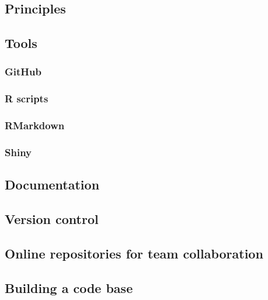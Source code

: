 \documentclass[
]{book}
\begin{document}
\hypertarget{principles}{%
\subsection{Principles}\label{principles}}

\hypertarget{tools}{%
\subsection{Tools}\label{tools}}

\hypertarget{github-1}{%
\subsubsection{GitHub}\label{github-1}}

\hypertarget{r-scripts}{%
\subsubsection{R scripts}\label{r-scripts}}

\hypertarget{rmarkdown}{%
\subsubsection{RMarkdown}\label{rmarkdown}}

\hypertarget{shiny}{%
\subsubsection{Shiny}\label{shiny}}

\hypertarget{documentation}{%
\subsection{Documentation}\label{documentation}}

\hypertarget{version-control}{%
\subsection{Version control}\label{version-control}}

\hypertarget{online-repositories-for-team-collaboration}{%
\subsection{Online repositories for team collaboration}\label{online-repositories-for-team-collaboration}}

\hypertarget{building-a-code-base}{%
\subsection{Building a code base}\label{building-a-code-base}}
\end{document}
